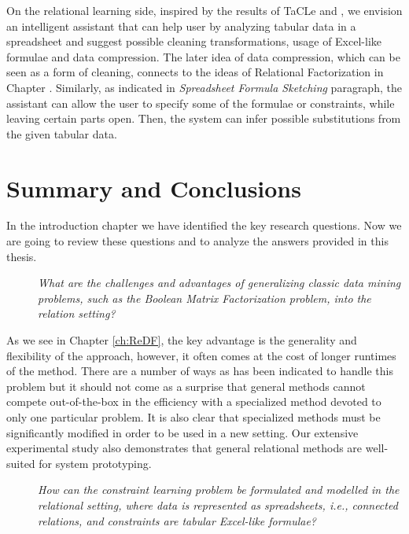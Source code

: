 On the relational learning side, inspired by the results of TaCLe
\cite{tacle} and \cite{flashfill}, we envision an intelligent
assistant that can help user by analyzing tabular data in a
spreadsheet and suggest possible cleaning transformations, usage of
Excel-like formulae and data compression. The later idea of data
compression, which can be seen as a form of cleaning, connects to the
ideas of Relational Factorization in Chapter \cite{ch:ReDF}.
Similarly, as indicated in \textit{Spreadsheet Formula Sketching}
paragraph, the assistant can allow the user to specify some of the
formulae or constraints, while leaving certain parts open. Then, the
system can infer possible substitutions from the given tabular data.


\section{Summary and Conclusions}
In the introduction chapter we have identified the key research
questions. Now we are going to review these questions and to analyze the answers provided in this thesis.

\begin{description}
\item[\cone] \textit{What are the challenges and advantages of generalizing
    classic data mining problems, such as the Boolean Matrix
  Factorization problem, into the relation setting?}
\end{description}

As we see in Chapter \ref{ch:ReDF}, the key advantage is the
generality and flexibility of the approach, however, it often comes at
the cost of longer runtimes of the method. There are a number of ways
as has been indicated to handle this problem but it should not come as
a surprise that general methods cannot compete out-of-the-box in the efficiency with
a specialized method devoted to only one particular problem. It is
also clear that specialized methods must be significantly modified in
order to be used in a new setting. Our extensive experimental study
also demonstrates that general relational methods are well-suited for
system prototyping.

\begin{description}
    \item[\ctwo] \textit{How can the constraint learning problem be formulated
   and modelled in the relational setting, where data is
   represented as spreadsheets, i.e., connected relations, and constraints are
   tabular Excel-like formulae?}
\end{description}

